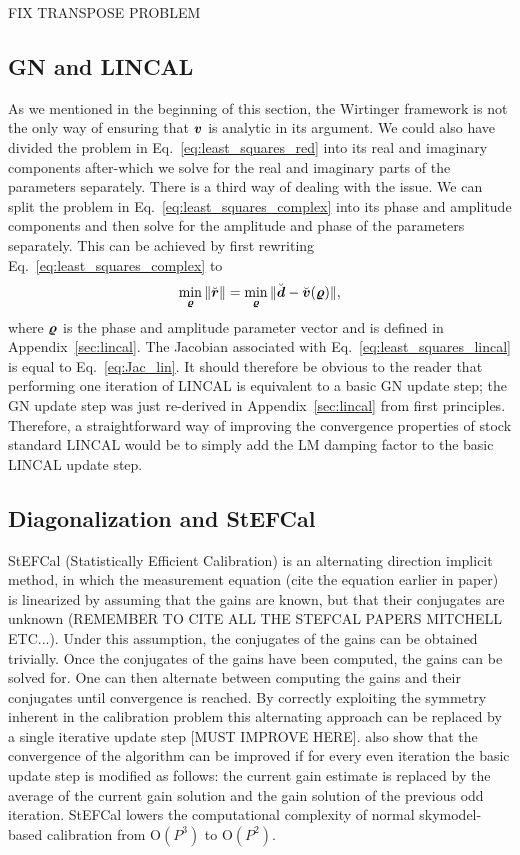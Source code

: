 \documentclass[useAMS,usenatbib]{mn2e}
\newcommand{\br}{\bmath{r}}
\newcommand{\bd}{\bmath{d}}
\newcommand{\bv}{\bmath{v}}
\begin{document}
FIX TRANSPOSE PROBLEM

\subsection{GN and LINCAL}
As we mentioned in the beginning of this section, the Wirtinger framework is not the only way of ensuring that $\bv$ is analytic in its argument. We could also 
have divided the problem in Eq.~\eqref{eq:least_squares_red} into its real and imaginary components after-which we solve for the real and imaginary parts of the parameters separately. There is a third way
of dealing with the issue. We can split the problem in Eq.~\eqref{eq:least_squares_complex} into its phase and amplitude components and then solve for the amplitude and phase of the parameters separately.
This can be achieved by first rewriting Eq.~\eqref{eq:least_squares_complex} to
\begin{equation}
\label{eq:least_squares_lincal}
\min_{\bmath{\varrho}} \|\breve{\br}\| = \min_{\bmath{\varrho}} \|\breve{\bd} - \breve{\bv}(\bmath{\varrho})\|, 
\end{equation}
where $\bmath{\varrho}$ is the phase and amplitude parameter vector and is defined in Appendix~\ref{sec:lincal}. The Jacobian associated with 
Eq.~\eqref{eq:least_squares_lincal} is equal to Eq.~\eqref{eq:Jac_lin}. It should therefore be obvious to the reader that 
performing one iteration of LINCAL is equivalent to a basic GN update step; the GN update step was just re-derived in Appendix~\ref{sec:lincal} from first principles.
Therefore, a straightforward way of improving the convergence properties of stock standard LINCAL would be to simply add the LM damping factor to the basic LINCAL update step. 

\subsection{Diagonalization and StEFCal}
StEFCal (Statistically Efficient Calibration) is an alternating direction implicit method, in which the measurement equation (cite the equation earlier in paper) is linearized by assuming that the gains are known, but
that their conjugates are unknown (REMEMBER TO CITE ALL THE STEFCAL PAPERS MITCHELL ETC...). Under this assumption, the conjugates of the gains can be obtained trivially. Once the conjugates of the gains have been computed, the gains can be solved for. One can then alternate between computing the gains and their conjugates until convergence
is reached. By correctly exploiting the symmetry inherent in the calibration problem this alternating approach can be replaced by a single iterative update step [MUST IMPROVE HERE]. \cite{Salvini2014} also show that
the convergence of the algorithm can be improved if for every even iteration the basic update step is modified as follows: the current gain estimate is replaced by the average of the current gain solution and the gain solution of the previous odd iteration.
StEFCal lowers the computational complexity of normal skymodel-based calibration from O$(P^3)$ to O$(P^2)$. 
\end{document}
